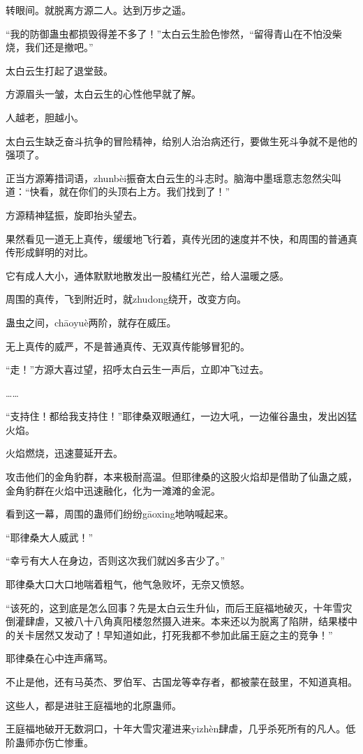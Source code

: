 \begin{this_body}
转眼间。就脱离方源二人。达到万步之遥。

“我的防御蛊虫都损毁得差不多了！”太白云生脸色惨然，“留得青山在不怕没柴烧，我们还是撤吧。”

太白云生打起了退堂鼓。

方源眉头一皱，太白云生的心性他早就了解。

人越老，胆越小。

太白云生缺乏奋斗抗争的冒险精神，给别人治治病还行，要做生死斗争就不是他的强项了。

正当方源筹措词语，zhunbèi振奋太白云生的斗志时。脑海中墨瑶意志忽然尖叫道：“快看，就在你们的头顶右上方。我们找到了！”

方源精神猛振，旋即抬头望去。

果然看见一道无上真传，缓缓地飞行着，真传光团的速度并不快，和周围的普通真传形成鲜明的对比。

它有成人大小，通体默默地散发出一股橘红光芒，给人温暖之感。

周围的真传，飞到附近时，就zhudong绕开，改变方向。

蛊虫之间，chāoyuè两阶，就存在威压。

无上真传的威严，不是普通真传、无双真传能够冒犯的。

“走！”方源大喜过望，招呼太白云生一声后，立即冲飞过去。

……

“支持住！都给我支持住！”耶律桑双眼通红，一边大吼，一边催谷蛊虫，发出凶猛火焰。

火焰燃烧，迅速蔓延开去。

攻击他们的金角豹群，本来极耐高温。但耶律桑的这股火焰却是借助了仙蛊之威，金角豹群在火焰中迅速融化，化为一滩滩的金泥。

看到这一幕，周围的蛊师们纷纷gāoxing地呐喊起来。

“耶律桑大人威武！”

“幸亏有大人在身边，否则这次我们就凶多吉少了。”

耶律桑大口大口地喘着粗气，他气急败坏，无奈又愤怒。

“该死的，这到底是怎么回事？先是太白云生升仙，而后王庭福地破灭，十年雪灾倒灌肆虐，又被八十八角真阳楼忽然摄入进来。本来还以为脱离了陷阱，结果楼中的关卡居然又发动了！早知道如此，打死我都不参加此届王庭之主的竞争！”

耶律桑在心中连声痛骂。

不止是他，还有马英杰、罗伯军、古国龙等幸存者，都被蒙在鼓里，不知道真相。

这些人，都是进驻王庭福地的北原蛊师。

王庭福地破开无数洞口，十年大雪灾灌进来yizhèn肆虐，几乎杀死所有的凡人。低阶蛊师亦伤亡惨重。


\end{this_body}
